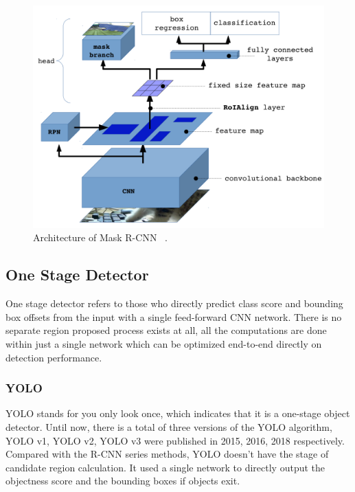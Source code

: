 \begin{figure}
    \begin{center}
    \includegraphics[scale=0.5]{figures/mask_r_cnn.png}
    \end{center}
    \caption{Architecture of Mask R-CNN ~\protect\cite{mask-r-cnn-slide}.}
    \label{fig:mask-r-cnn}
\end{figure}


\subsection{One Stage Detector}
\label{sec:related-worked-one-stage-detector}

One stage detector refers to those who directly predict class score and bounding
box offsets from the input with a single feed-forward CNN network. There is no
separate region proposed process exists at all, all the computations are done
within just a single network which can be optimized end-to-end directly on
detection performance.

\subsubsection{YOLO}
\label{sec:related-worked-yolo}

YOLO stands for you only look once, which indicates that it is a one-stage
object detector. Until now, there is a total of
three versions of the YOLO algorithm, YOLO v1, YOLO v2, YOLO v3 were published
in 2015, 2016, 2018 respectively. Compared
with the R-CNN series methods, YOLO doesn't have the stage of candidate region
calculation. It used a single network to
directly output the objectness score and the bounding boxes if objects exit.

